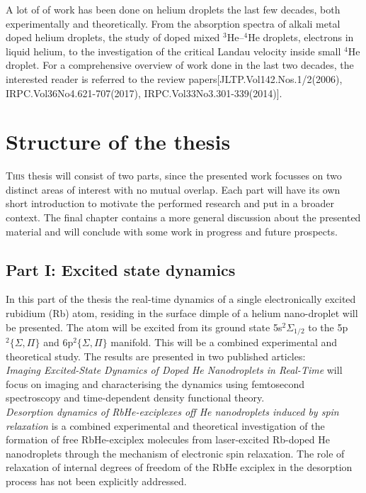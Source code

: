 \documentclass[12pt,a4paper,twosides]{book}
\begin{document}
		A lot of of work has been done on helium droplets the last few decades, both experimentally and theoretically. From the absorption spectra of alkali metal doped helium droplets, the study of doped mixed $^3$He--$^4$He droplets, electrons in liquid helium, to the investigation of the critical Landau velocity inside small $^4$He droplet. For a comprehensive overview of work done in the last two decades, the interested reader is referred to the review papers[JLTP.Vol142.Nos.1/2(2006), IRPC.Vol36No4.621-707(2017), IRPC.Vol33No3.301-339(2014)].

	\section{Structure of the thesis}
		\lettrine[lines=3,findent=3pt,nindent=0pt]{T}{his} thesis will consist of two parts, since the presented work focusses on two distinct areas of interest with no mutual overlap. Each part will have its own short introduction to motivate the performed research and put in a broader context. The final chapter contains a more general discussion about the presented material and will conclude with some work in progress and future prospects.

		\subsection{Part I: Excited state dynamics}
			In this part of the thesis the real-time dynamics of a single electronically excited rubidium (Rb) atom, residing in the surface dimple of a helium nano-droplet will be presented. The atom will be excited from its ground state 5s$^2\Sigma_{1/2}$ to the 5p$^2\{\Sigma,\Pi\}$ and 6p$^2\{\Sigma,\Pi\}$ manifold. This will be a combined experimental and theoretical study. The results are presented in two published articles:\\
		
			\emph{Imaging Excited-State Dynamics of Doped He Nanodroplets in Real-Time} will focus on imaging and characterising the dynamics using femtosecond spectroscopy and  time-dependent density functional theory.\\
		
			\emph{Desorption dynamics of RbHe-exciplexes off He nanodroplets induced by spin relaxation} is a combined experimental and theoretical investigation of the formation of free RbHe-exciplex molecules from laser-excited Rb-doped He nanodroplets through the mechanism of electronic spin relaxation. The role of relaxation of internal degrees of freedom of the RbHe exciplex in the desorption process has not been explicitly addressed.
\end{document}
